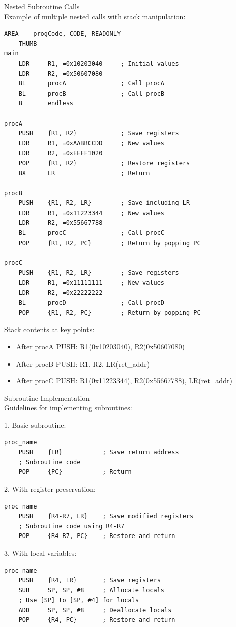 \begin{example2}{Nested Subroutine Calls}\\
Example of multiple nested calls with stack manipulation:
\begin{lstlisting}[language=armasm, style=basesmol]
    AREA    progCode, CODE, READONLY
    THUMB
main
    LDR     R1, =0x10203040     ; Initial values
    LDR     R2, =0x50607080
    BL      procA               ; Call procA
    BL      procB               ; Call procB
    B       endless

procA
    PUSH    {R1, R2}            ; Save registers
    LDR     R1, =0xAABBCCDD     ; New values
    LDR     R2, =0xEEFF1020
    POP     {R1, R2}            ; Restore registers
    BX      LR                  ; Return

procB
    PUSH    {R1, R2, LR}        ; Save including LR
    LDR     R1, =0x11223344     ; New values
    LDR     R2, =0x55667788
    BL      procC               ; Call procC
    POP     {R1, R2, PC}        ; Return by popping PC

procC
    PUSH    {R1, R2, LR}        ; Save registers
    LDR     R1, =0x11111111     ; New values
    LDR     R2, =0x22222222
    BL      procD               ; Call procD
    POP     {R1, R2, PC}        ; Return by popping PC
\end{lstlisting}

Stack contents at key points:
\begin{itemize}
  \item After procA PUSH: R1(0x10203040), R2(0x50607080)
  \item After procB PUSH: R1, R2, LR(ret\_addr)
  \item After procC PUSH: R1(0x11223344), R2(0x55667788), LR(ret\_addr)
\end{itemize}
\end{example2}

\begin{KR}{Subroutine Implementation}\\
Guidelines for implementing subroutines:

1. Basic subroutine:
\begin{lstlisting}[language=armasm, style=basesmol]
proc_name
    PUSH    {LR}           ; Save return address
    ; Subroutine code
    POP     {PC}           ; Return
\end{lstlisting}

2. With register preservation:
\begin{lstlisting}[language=armasm, style=basesmol]
proc_name
    PUSH    {R4-R7, LR}    ; Save modified registers
    ; Subroutine code using R4-R7
    POP     {R4-R7, PC}    ; Restore and return
\end{lstlisting}

3. With local variables:
\begin{lstlisting}[language=armasm, style=basesmol]
proc_name
    PUSH    {R4, LR}       ; Save registers
    SUB     SP, SP, #8     ; Allocate locals
    ; Use [SP] to [SP, #4] for locals
    ADD     SP, SP, #8     ; Deallocate locals
    POP     {R4, PC}       ; Restore and return
\end{lstlisting}
\end{KR}

